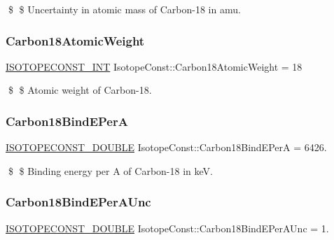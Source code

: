 \$ \$ Uncertainty in atomic mass of Carbon-\/18 in amu. \mbox{\label{group___isotope_const-_carbon-_c18_ga2e466070d27dafffbe96f69a9a19921d}} 
\subsubsection{\texorpdfstring{Carbon18\+Atomic\+Weight}{Carbon18AtomicWeight}}
{\footnotesize\ttfamily \mbox{\hyperlink{group___isotope_const-_macros_ga5f18360b3e99483a35c32d789e62621c}{I\+S\+O\+T\+O\+P\+E\+C\+O\+N\+S\+T\+\_\+\+I\+NT}} Isotope\+Const\+::\+Carbon18\+Atomic\+Weight = 18}

\$ \$ Atomic weight of Carbon-\/18. \mbox{\label{group___isotope_const-_carbon-_c18_gac554f1749e39cd71aafda7eec9412b0e}} 
\subsubsection{\texorpdfstring{Carbon18\+Bind\+E\+PerA}{Carbon18BindEPerA}}
{\footnotesize\ttfamily \mbox{\hyperlink{group___isotope_const-_macros_ga8f45a7272ce02c0b4c65c44636ed719a}{I\+S\+O\+T\+O\+P\+E\+C\+O\+N\+S\+T\+\_\+\+D\+O\+U\+B\+LE}} Isotope\+Const\+::\+Carbon18\+Bind\+E\+PerA = 6426.}

\$ \$ Binding energy per A of Carbon-\/18 in keV. \mbox{\label{group___isotope_const-_carbon-_c18_ga57917a5030b525126ce3cade61f79910}} 
\subsubsection{\texorpdfstring{Carbon18\+Bind\+E\+Per\+A\+Unc}{Carbon18BindEPerAUnc}}
{\footnotesize\ttfamily \mbox{\hyperlink{group___isotope_const-_macros_ga8f45a7272ce02c0b4c65c44636ed719a}{I\+S\+O\+T\+O\+P\+E\+C\+O\+N\+S\+T\+\_\+\+D\+O\+U\+B\+LE}} Isotope\+Const\+::\+Carbon18\+Bind\+E\+Per\+A\+Unc = 1.}

